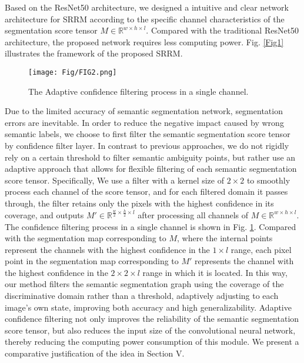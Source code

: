 \documentclass[conference]{IEEEtran}
\begin{document}
Based on the ResNet50 architecture, we designed a intuitive and clear network architecture for SRRM according to the specific channel characteristics of the segmentation score tensor $M \in \mathbb{R}^{w \times h \times l}$. Compared with the traditional ResNet50 architecture, the proposed network requires less computing power. Fig. \ref{Fig1} illustrates the framework of the proposed SRRM.

\begin{figure}[hbp]
    \centering
    \texttt{[image: Fig/FIG2.png]}
    \caption{The Adaptive confidence filtering process in a single channel.}
    \label{Fig2}
\end{figure}

Due to the limited accuracy of semantic segmentation network, segmentation errors are inevitable. In order to reduce the negative impact caused by wrong semantic labels, we choose to first filter the semantic segmentation score tensor by confidence filter layer. In contrast to previous approaches, we do not rigidly rely on a certain threshold to filter semantic ambiguity points, but rather use an adaptive approach that allows for flexible filtering of each semantic segmentation score tensor. Specifically, We use a filter with a kernel size of $2 \times 2$ to smoothly process each channel of the score tensor, and for each filtered domain it passes through, the filter retains only the pixels with the highest confidence in its coverage, and outputs $M' \in \mathbb{R}^{\frac{w}{2} \times \frac{h}{2} \times l}$ after processing all channels of $M \in \mathbb{R}^{w \times h \times l}$. The confidence filtering process in a single channel is shown in Fig. \ref{Fig2}. Compared with the segmentation map corresponding to $M$, where the internal points represent the channels with the highest confidence in the $1 \times l$ range, each pixel point in the segmentation map corresponding to $M'$ represents the channel with the highest confidence in the $2 \times 2 \times l$ range in which it is located. In this way, our method filters the semantic segmentation graph using the coverage of the discriminative domain rather than a threshold, adaptively adjusting to each image's own state, improving both accuracy and high generalizability. Adaptive confidence filtering not only improves the reliability of the semantic segmentation score tensor, but also reduces the input size of the convolutional neural network, thereby reducing the computing power consumption of this module. We present a comparative justification of the idea in Section V.
\end{document}
